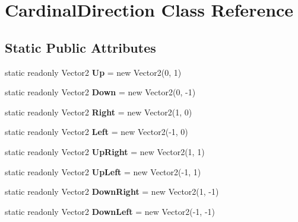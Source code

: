 \hypertarget{class_cardinal_direction}{}\section{Cardinal\+Direction Class Reference}
\label{class_cardinal_direction}
\subsection*{Static Public Attributes}
\begin{DoxyCompactItemize}
\item 
\mbox{\label{class_cardinal_direction_a075061f944ac5a036d2bfe933c225b78}} 
static readonly Vector2 {\bfseries Up} = new Vector2(0, 1)
\item 
\mbox{\label{class_cardinal_direction_a8afc7915bb6e10d5a71694c4c69eab0f}} 
static readonly Vector2 {\bfseries Down} = new Vector2(0, -\/1)
\item 
\mbox{\label{class_cardinal_direction_afc02faa0f2dcad38e44af093a90ff84b}} 
static readonly Vector2 {\bfseries Right} = new Vector2(1, 0)
\item 
\mbox{\label{class_cardinal_direction_ac5a4772e9cbceb5955d5b5d9df5f8592}} 
static readonly Vector2 {\bfseries Left} = new Vector2(-\/1, 0)
\item 
\mbox{\label{class_cardinal_direction_a78ae8cab8ecffb7ff7aa0b007d4e39f0}} 
static readonly Vector2 {\bfseries Up\+Right} = new Vector2(1, 1)
\item 
\mbox{\label{class_cardinal_direction_a9d293be8eb20314e7eee87062ebc13ea}} 
static readonly Vector2 {\bfseries Up\+Left} = new Vector2(-\/1, 1)
\item 
\mbox{\label{class_cardinal_direction_a32d4c8c476d7e20fd57b4f8ea33b0586}} 
static readonly Vector2 {\bfseries Down\+Right} = new Vector2(1, -\/1)
\item 
\mbox{\label{class_cardinal_direction_a9ef84b62c3b7e092898e5cc7c1bfd7dd}} 
static readonly Vector2 {\bfseries Down\+Left} = new Vector2(-\/1, -\/1)
\end{DoxyCompactItemize}


